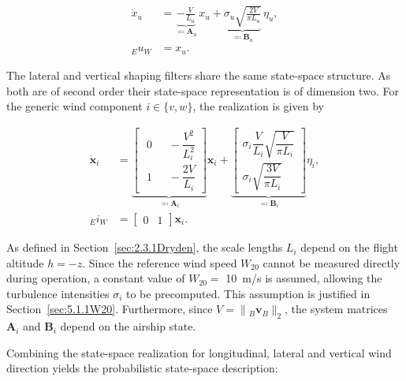 \begin{align}
	\dot{x}_u
	&=
	\underbrace{
	-\frac{V}{L_u}
	}_{\eqqcolon \bm{A}_u
	}
	\, x_u
	+ 
	\underbrace{
		\sigma_u
		\sqrt{\frac{2V}{\pi L_u}}
	}_{\eqqcolon \bm{B}_u
	}
	\, \eta_u, 
	\\[4pt]
	{}_E u_W
	&=
	x_u.
\end{align}

The lateral and vertical shaping filters share the same state-space structure. As both are of second order their state-space representation is of dimension two. For the generic wind component $i\in\{v,w\}$, the realization is given by

\begin{align}
	\dot{\bm{x}}_i
	&=
	\underbrace{
	\begin{bmatrix}
		\hspace{4pt} 0 & \hspace{8pt} -\dfrac{V^2}{L_i^2}
		\\[1.5em]
		\hspace{4pt} 1 & \hspace{8pt} -\dfrac{2V}{L_i}
	\end{bmatrix}
	}_{\eqqcolon \bm{A}_i}
	\bm{x}_i
	+
	\underbrace{
	\begin{bmatrix}
		\sigma_i \dfrac{V}{L_i}\sqrt{\dfrac{V}{\pi L_i}} 
		\\[1.5em]
		\sigma_i \sqrt{\dfrac{3V}{\pi L_i}}
	\end{bmatrix}
	}_{\eqqcolon \bm{B}_i}
	\eta_i,
	\\[8pt]
	{}_E i_W
	&=
	\begin{bmatrix}
		0 &	1
	\end{bmatrix}
	\bm{x}_i .
\end{align}

As defined in Section~\ref{sec:2.3.1Dryden}, the scale lengths $L_i$ depend on the flight altitude $h=-z$. Since the reference wind speed $W_{20}$ cannot be measured directly during operation, a constant value of $W_{20}=$ \SI{10}{m/s} is assumed, allowing the turbulence intensities $\sigma_i$ to be precomputed. This assumption is justified in Section~\ref{sec:5.1.1W20}.
Furthermore, since $V=\|{}_B\bm{v}_B\|_2$, the system matrices $\bm{A}_i$ and $\bm{B}_i$ depend on the airship state.

Combining the state-space realization for longitudinal, lateral and vertical wind direction yields the probabilistic state-space description:


